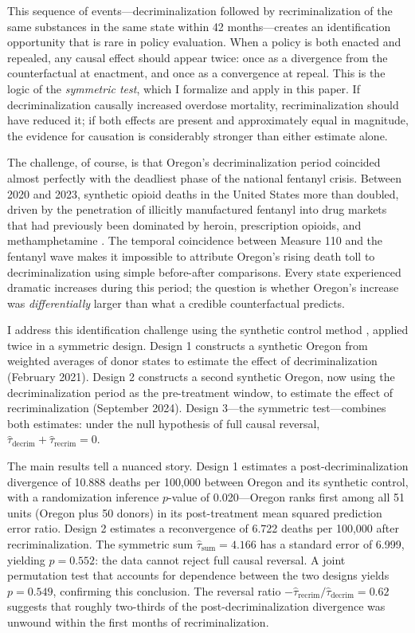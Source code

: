 \documentclass[12pt]{article}
\begin{document}
This sequence of events---decriminalization followed by recriminalization of the same substances in the same state within 42 months---creates an identification opportunity that is rare in policy evaluation. When a policy is both enacted and repealed, any causal effect should appear twice: once as a divergence from the counterfactual at enactment, and once as a convergence at repeal. This is the logic of the \textit{symmetric test}, which I formalize and apply in this paper. If decriminalization causally increased overdose mortality, recriminalization should have reduced it; if both effects are present and approximately equal in magnitude, the evidence for causation is considerably stronger than either estimate alone.

The challenge, of course, is that Oregon's decriminalization period coincided almost perfectly with the deadliest phase of the national fentanyl crisis. Between 2020 and 2023, synthetic opioid deaths in the United States more than doubled, driven by the penetration of illicitly manufactured fentanyl into drug markets that had previously been dominated by heroin, prescription opioids, and methamphetamine \citep{cdc2023vsrr}. The temporal coincidence between Measure 110 and the fentanyl wave makes it impossible to attribute Oregon's rising death toll to decriminalization using simple before-after comparisons. Every state experienced dramatic increases during this period; the question is whether Oregon's increase was \textit{differentially} larger than what a credible counterfactual predicts.

I address this identification challenge using the synthetic control method \citep{abadie2003economic, abadie2010synthetic, abadie2021penalized}, applied twice in a symmetric design. Design 1 constructs a synthetic Oregon from weighted averages of donor states to estimate the effect of decriminalization (February 2021). Design 2 constructs a second synthetic Oregon, now using the decriminalization period as the pre-treatment window, to estimate the effect of recriminalization (September 2024). Design 3---the symmetric test---combines both estimates: under the null hypothesis of full causal reversal, $\hat{\tau}_{\text{decrim}} + \hat{\tau}_{\text{recrim}} = 0$.

The main results tell a nuanced story. Design 1 estimates a post-decriminalization divergence of 10.888 deaths per 100,000 between Oregon and its synthetic control, with a randomization inference $p$-value of 0.020---Oregon ranks first among all 51 units (Oregon plus 50 donors) in its post-treatment mean squared prediction error ratio. Design 2 estimates a reconvergence of 6.722 deaths per 100,000 after recriminalization. The symmetric sum $\hat{\tau}_{\text{sum}} = 4.166$ has a standard error of 6.999, yielding $p = 0.552$: the data cannot reject full causal reversal. A joint permutation test that accounts for dependence between the two designs yields $p = 0.549$, confirming this conclusion. The reversal ratio $-\hat{\tau}_{\text{recrim}} / \hat{\tau}_{\text{decrim}} = 0.62$ suggests that roughly two-thirds of the post-decriminalization divergence was unwound within the first months of recriminalization.
\end{document}

